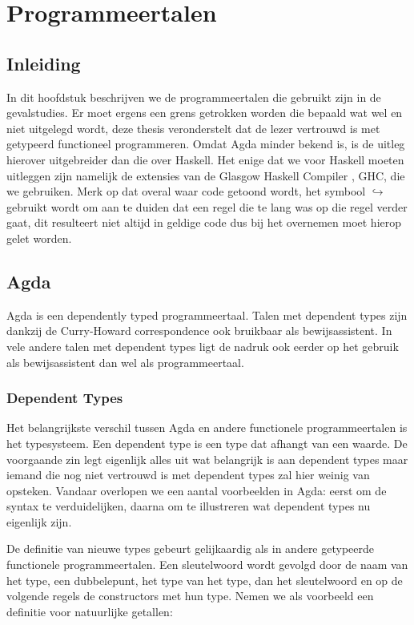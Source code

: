 \chapter{Programmeertalen}
\label{ch:agda-haskell}


\section{Inleiding}

In dit hoofdstuk beschrijven we de programmeertalen die gebruikt zijn in de
gevalstudies. Er moet ergens een grens getrokken worden die bepaald wat wel en
niet uitgelegd wordt, deze thesis veronderstelt dat de lezer vertrouwd is met
getypeerd functioneel programmeren. Omdat Agda minder bekend is, is de uitleg
hierover uitgebreider dan die over Haskell. Het enige dat we voor Haskell
moeten uitleggen zijn namelijk de extensies van de Glasgow Haskell Compiler
\cite{ghc}, GHC, die we gebruiken. Merk op dat overal waar code getoond wordt,
het symbool {\tiny\ensuremath{\hookrightarrow}} gebruikt wordt om aan te duiden
dat een regel die te lang was op die regel verder gaat, dit resulteert niet
altijd in geldige code dus bij het overnemen moet hierop gelet worden.


\section{Agda}

Agda is een dependently typed programmeertaal. Talen met dependent types zijn
dankzij de Curry-Howard correspondence ook bruikbaar als bewijsassistent. In
vele andere talen met dependent types ligt de nadruk ook eerder op het gebruik
als bewijsassistent dan wel als programmeertaal.

\subsection{Dependent Types}
\label{sec:indfamagda}

Het belangrijkste verschil tussen Agda en andere functionele programmeertalen
is het typesysteem. Een dependent type is een type dat afhangt van een waarde.
De voorgaande zin legt eigenlijk alles uit wat belangrijk is aan dependent
types maar iemand die nog niet vertrouwd is met dependent types zal hier weinig
van opsteken. Vandaar overlopen we een aantal voorbeelden in Agda: eerst om de
syntax te verduidelijken, daarna om te illustreren wat dependent types nu
eigenlijk zijn.

De definitie van nieuwe types gebeurt gelijkaardig als in andere getypeerde
functionele programmeertalen. Een  sleutelwoord wordt gevolgd door
de naam van het type, een dubbelepunt, het type van het type, dan het
sleutelwoord  en op de volgende regels de constructors met hun
type. Nemen we als voorbeeld een definitie voor natuurlijke getallen:

